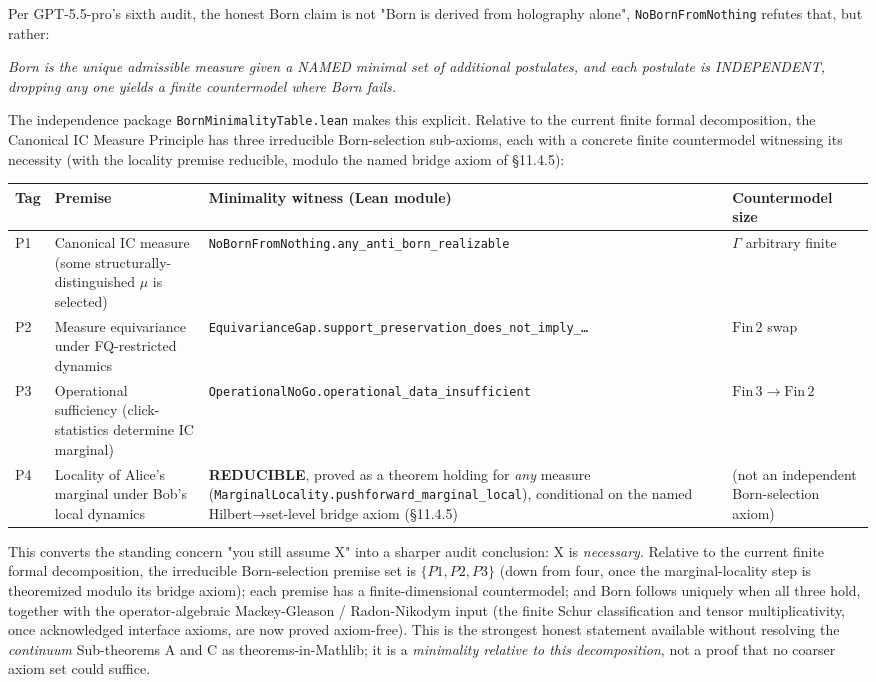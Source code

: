 \documentclass[11pt,a4paper]{article}
\newenvironment{qiqtquote}{\begin{mdframed}[style=quotestyle]}{\end{mdframed}}
\begin{document}
Per GPT-5.5-pro's sixth audit, the honest Born claim is not "Born is derived from holography alone", \texttt{NoBornFromNothing} refutes that, but rather:

\begin{qiqtquote}
\emph{Born is the unique admissible measure given a NAMED minimal set of additional postulates, and each postulate is INDEPENDENT, dropping any one yields a finite countermodel where Born fails.}
\end{qiqtquote}

The independence package \texttt{BornMinimalityTable.lean} makes this explicit. Relative to the current finite formal decomposition, the Canonical IC Measure Principle has three irreducible Born-selection sub-axioms, each with a concrete finite countermodel witnessing its necessity (with the locality premise reducible, modulo the named bridge axiom of §11.4.5):

\begin{center}
\small
\begin{tabularx}{\linewidth}{|Y|Y|Y|Y|}
\hline
\textbf{Tag} & \textbf{Premise} & \textbf{Minimality witness (Lean module)} & \textbf{Countermodel size} \\
\hline
P1 & Canonical IC measure (some structurally-distinguished $\mu$ is selected) & \texttt{NoBornFromNothing.any\_anti\_born\_realizable} & $\Gamma$ arbitrary finite \\
\hline
P2 & Measure equivariance under FQ-restricted dynamics & \texttt{EquivarianceGap.support\_preservation\_does\_not\_imply\_…} & $\mathrm{Fin}\,2$ swap \\
\hline
P3 & Operational sufficiency (click-statistics determine IC marginal) & \texttt{OperationalNoGo.operational\_data\_insufficient} & $\mathrm{Fin}\,3 \to \mathrm{Fin}\,2$ \\
\hline
P4 & Locality of Alice's marginal under Bob's local dynamics & \textbf{REDUCIBLE}, proved as a theorem holding for \emph{any} measure (\texttt{MarginalLocality.pushforward\_marginal\_local}), conditional on the named Hilbert→set-level bridge axiom (§11.4.5) & (not an independent Born-selection axiom) \\
\hline
\end{tabularx}
\end{center}

This converts the standing concern "you still assume X" into a sharper audit conclusion: X is \emph{necessary}. Relative to the current finite formal decomposition, the irreducible Born-selection premise set is $\{P1, P2, P3\}$ (down from four, once the marginal-locality step is theoremized modulo its bridge axiom); each premise has a finite-dimensional countermodel; and Born follows uniquely when all three hold, together with the operator-algebraic Mackey-Gleason / Radon-Nikodym input (the finite Schur classification and tensor multiplicativity, once acknowledged interface axioms, are now proved axiom-free). This is the strongest honest statement available without resolving the \emph{continuum} Sub-theorems A and C as theorems-in-Mathlib; it is a \emph{minimality relative to this decomposition}, not a proof that no coarser axiom set could suffice.
\end{document}
